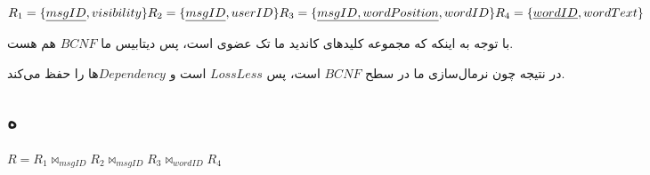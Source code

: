 \setLTR
$
R_1 = \{\underline{msgID},visibility\}\\
R_2 = \{\underline{msgID},userID\} \\
R_3 = \{\underline{msgID,wordPosition},wordID\}\\
R_4 = \{\underline{wordID},wordText\}
$
\setRTL

با توجه به اینکه که مجموعه کلیدهای کاندید ما تک عضوی است، پس دیتابیس ما 
$BCNF$
هم هست.

در نتیجه چون نرمال‌سازی ما در سطح $BCNF$ است، پس $LossLess$ است و $Dependency$ها را حفظ می‌کند.
\subsection*{ه}

\setLTR
$
R = R_1 \bowtie_{msgID} R_2 \bowtie_{msgID} R_3 \bowtie_{wordID} R_4
$
\setRTL
